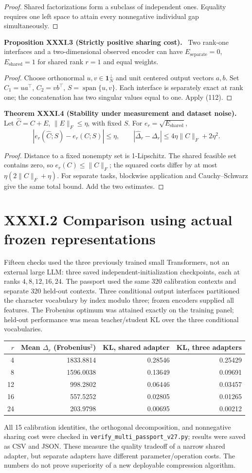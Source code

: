 \documentclass[11pt,a4paper,oneside]{book}
\newcommand{\one}{\mathbf 1}\newcommand{\ii}{\mathrm i}\newcommand{\dd}{\mathrm d}
\newcommand{\statement}[3]{\par\medskip\noindent\textbf{#1 #2 (#3).}\ }
\begin{document}
\begin{proof}Shared factorizations form a subclass of independent ones. Equality requires one left space to attain every nonnegative individual gap simultaneously.\end{proof}
\statement{Proposition}{XXXI.3}{Strictly positive sharing cost} Two rank-one interfaces and a two-dimensional observed encoder can have $E_{\mathrm{separate}}=0$, $E_{\mathrm{shared}}=1$ for shared rank $r=1$ and equal weights.
\begin{proof}Choose orthonormal $u,v\in\one_N^\perp$ and unit centered output vectors $a,b$. Set $C_1=ua^\top$, $C_2=vb^\top$, $S=\operatorname{span}\{u,v\}$. Each interface is separately exact at rank one; the concatenation has two singular values equal to one. Apply (112).\end{proof}
\statement{Theorem}{XXXI.4}{Stability under measurement and dataset noise} Let $\widehat C=C+E$, $\|E\|_F\le\eta$, with fixed $S$. For $e_r=\sqrt{E_{\mathrm{shared}}}$,
\[|e_r(\widehat C;S)-e_r(C;S)|\le\eta,\qquad|\widehat\Delta_r-\Delta_r|\le4\eta\|C\|_F+2\eta^2.\]
\begin{proof}Distance to a fixed nonempty set is 1-Lipschitz. The shared feasible set contains zero, so $e_r(C)\le\|C\|_F$; the squared costs differ by at most $\eta(2\|C\|_F+\eta)$. For separate tasks, blockwise application and Cauchy--Schwarz give the same total bound. Add the two estimates.\end{proof}
\section*{XXXI.2 Comparison using actual frozen representations}
Fifteen checks used the three previously trained small Transformers, not an external large LLM: three saved independent-initialization checkpoints, each at ranks $4,8,12,16,24$. The passport used the same 320 calibration contexts and separate 320 held-out contexts. Three conditional output interfaces partitioned the character vocabulary by index modulo three; frozen encoders supplied all features. The Frobenius optimum was attained exactly on the training panel; held-out performance was mean teacher/student KL over the three conditional vocabularies.
\begin{center}\begin{tabular}{rrrr}\toprule
$r$&Mean $\Delta_r$ (Frobenius$^2$)&KL, shared adapter&KL, three adapters\\\midrule
4&1833.8814&0.28546&0.25429\\8&1596.0038&0.13649&0.09691\\12&998.2802&0.06446&0.03457\\16&557.5252&0.02805&0.01265\\24&203.9798&0.00695&0.00212\\\bottomrule
\end{tabular}\end{center}
All 15 calibration identities, the orthogonal decomposition, and nonnegative sharing cost were checked in \texttt{verify\_multi\_passport\_v27.py}; results were saved as CSV and JSON. These measure the quality tradeoff of a narrow shared adapter, but separate adapters have different parameter/operation costs. The numbers do not prove superiority of a new deployable compression algorithm.
\end{document}
